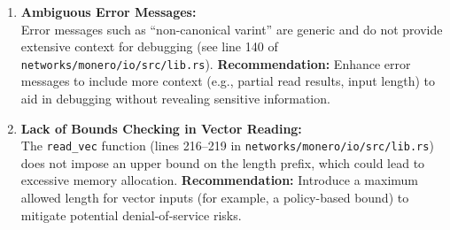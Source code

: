 \documentclass[12pt,a4paper]{article}
\begin{document}
\begin{enumerate}
    \item \textbf{Ambiguous Error Messages:}\\
    Error messages such as “non-canonical varint” are generic and do not provide extensive context for debugging (see line 140 of \texttt{networks/monero/io/src/lib.rs}). 
    \textbf{Recommendation:} Enhance error messages to include more context (e.g., partial read results, input length) to aid in debugging without revealing sensitive information.
    
    \item \textbf{Lack of Bounds Checking in Vector Reading:}\\
    The \texttt{read\_vec} function (lines 216--219 in \texttt{networks/monero/io/src/lib.rs}) does not impose an upper bound on the length prefix, which could lead to excessive memory allocation.
    \textbf{Recommendation:} Introduce a maximum allowed length for vector inputs (for example, a policy-based bound) to mitigate potential denial-of-service risks.

\end{enumerate}

\end{document}
